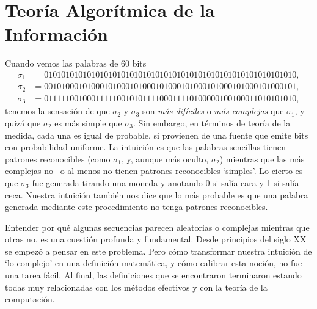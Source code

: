 \section{Teoría Algorítmica de la Información}


Cuando vemos las palabras de 60 bits
\begin{align*}
\sigma_1 &= 01010101010101010101010101010101010101010101010101010101010,\\
\sigma_2 &= 00101000101000101000101000101000101000101000101000101000101,\\
\sigma_3 &= 01111100100011111001010111100011110100000100100011010101010,
\end{align*}
tenemos la sensación de que  $\sigma_2$ y  $\sigma_3$
son {\em más difíciles} o {\em más complejas} que $\sigma_1$, y quizá que $\sigma_2$ es más simple que $\sigma_3$. Sin embargo, en términos de
teoría de la medida, cada una es igual de probable, si provienen de una fuente que emite bits 
con probabilidad uniforme. 
La intuición es que las palabras sencillas tienen patrones reconocibles (como $\sigma_1$, y, aunque más oculto, $\sigma_2$) mientras que las más complejas no --o al menos no tienen patrones reconocibles `simples'. Lo cierto es que $\sigma_3$ fue generada tirando una moneda y anotando 0 si salía cara y 1 si salía ceca. Nuestra intuición también nos dice que lo más probable es que una palabra generada mediante este procedimiento no tenga patrones reconocibles.

Entender por qué
algunas secuencias parecen aleatorias o complejas mientras que otras no, es una cuestión
profunda y fundamental. Desde principios del siglo {\small XX} se
empezó a pensar en este problema. Pero cómo transformar nuestra
intuición de `lo complejo' en una definición matemática, y cómo calibrar esta noción, no fue una tarea fácil. 
Al final, las definiciones que se
encontraron terminaron estando todas muy relacionadas con los métodos efectivos y con la 
teoría de la computación.


